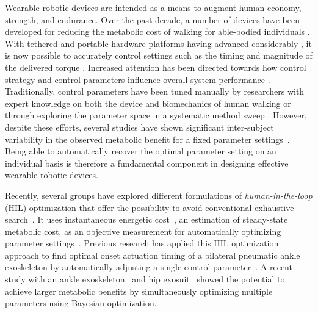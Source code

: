 Wearable robotic devices are intended as a means to augment human economy, strength, and endurance. Over the past decade, a number of devices have been developed for reducing the metabolic cost of walking for able-bodied individuals \citep{Malcolm2013, Mooney2016, Caputo2014,  Panizzolo2016}. With tethered and portable hardware platforms having advanced considerably \citep{Malcolm2013, Lee2018, Panizzolo2015}, it is now possible to accurately control settings such as the timing and magnitude of the delivered torque \citep{Malcolm2013, Collins2015, Ding2017, Kim2015, Kim2017inv, Lee2016}. Increased attention has been directed towards how control strategy and control parameters influence overall system performance \citep{Caputo2014, Kim2015, Kim2017inv, Quinlivan2017}. Traditionally, control parameters have been tuned manually by researchers with expert knowledge on both the device and biomechanics of human walking or through exploring the parameter space in a systematic method sweep \citep{Caputo2015, Quinlivan2017}. However, despite these efforts, several studies have shown significant inter-subject variability in the observed metabolic benefit for a fixed parameter settings~\citep{Quesada2016}. Being able to automatically recover the optimal parameter setting on an individual basis is therefore a fundamental component in designing effective wearable robotic devices.

Recently, several groups have explored different formulations of \emph{human-in-the-loop} (HIL) optimization that offer the possibility to avoid conventional exhaustive search~\citep{Koller2016, Zhang2017, Ding2018, Kim2017}. It uses instantaneous energetic cost~\citep{Selinger2014}, an estimation of steady-state metabolic cost, as an objective measurement for automatically optimizing parameter settings~\citep{Koller2016, Felt2015, Zhang2017, Ding2018}. Previous research has applied this HIL optimization approach to find optimal onset actuation timing of a bilateral pneumatic ankle exoskeleton by automatically adjusting a single control parameter~\citep{Koller2016}. A recent study with an ankle exoskeleton~\citep{Zhang2017} and hip exosuit~\citep{Ding2018} showed the potential to achieve larger metabolic benefits by simultaneously optimizing multiple parameters using Bayesian optimization.

